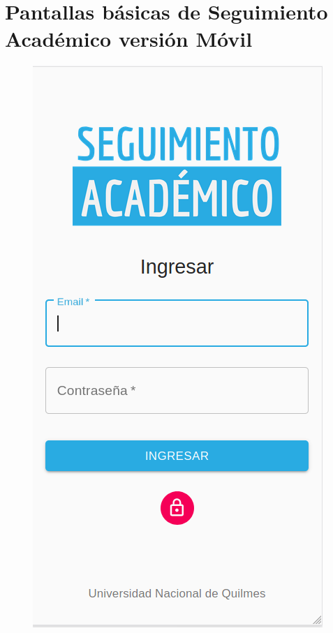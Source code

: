 \section{Pantallas básicas de Seguimiento Académico versión Móvil}

\begin{figure}[!htbp]
  \centering
    \includegraphics[scale=0.3]{images/seguimiento-academico/sa-mobile-login.png}
  \label{fig:sa-login-mobile}
\end{figure}

